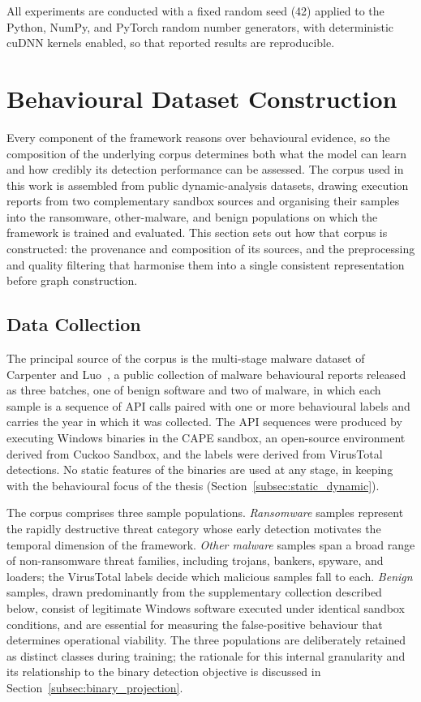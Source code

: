 \documentclass[%
    BCOR=10mm,
    DIV=13,
    toc=bibliography,
    toc=listof,
    oneside,
    12pt,
]{scrbook}
\begin{document}
All experiments are conducted with a fixed random seed (42) applied to the
Python, NumPy, and PyTorch random number generators, with deterministic cuDNN
kernels enabled, so that reported results are reproducible.

\section{Behavioural Dataset Construction}
\label{sec:dataset}

Every component of the framework reasons over behavioural evidence, so the
composition of the underlying corpus determines both what the model can learn
and how credibly its detection performance can be assessed. The corpus used in
this work is assembled from public dynamic-analysis datasets, drawing execution
reports from two complementary sandbox sources and organising their samples
into the ransomware, other-malware, and benign populations on which the
framework is trained and evaluated. This section sets out how that corpus is
constructed: the provenance and composition of its sources, and the
preprocessing and quality filtering that harmonise them into a single consistent
representation before graph construction.

\subsection{Data Collection}
\label{subsec:data_collection}

The principal source of the corpus is the multi-stage malware dataset of
Carpenter and Luo~\cite{carpenter2023}, a public collection of malware
behavioural reports released as three batches, one of benign software and two
of malware, in which each sample is a sequence of API calls paired with one or
more behavioural labels and carries the year in which it was collected. The API
sequences were produced by executing Windows binaries in the CAPE sandbox, an
open-source environment derived from Cuckoo Sandbox, and the labels were
derived from VirusTotal detections. No static
features of the binaries are used at any stage, in keeping with the behavioural
focus of the thesis (Section~\ref{subsec:static_dynamic}).

The corpus comprises three sample populations. \emph{Ransomware} samples
represent the rapidly destructive threat category whose early detection
motivates the temporal dimension of the framework. \emph{Other malware}
samples span a broad range of non-ransomware threat families, including
trojans, bankers, spyware, and loaders; the VirusTotal labels decide which
malicious samples fall to each. \emph{Benign} samples, drawn predominantly from
the supplementary collection described below, consist of legitimate Windows
software executed under identical sandbox conditions, and are essential for
measuring the false-positive behaviour that determines operational viability.
The three populations are deliberately retained as
distinct classes during training; the rationale for this internal granularity
and its relationship to the binary detection objective is discussed in
Section~\ref{subsec:binary_projection}.
\end{document}
